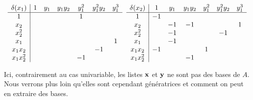 \documentclass{standalone}
\begin{document}
\begin{exmp}
$$\begin{array}{c|cccccc}
	\delta(x_1) & 1 & y_1 & y_1y_2 & y_1^2 & y_1^2y_2 & y_1^3 \\
	\hline
	1 &  &  &  & 1 &  & \\
	x_2 &  &  &  &  &  & \\
	x_2^2 &  &  &  &  &  & \\
	x_1 &  &  &  &  &  & 1\\
	x_1x_2 &  &  &  &  & -1 & \\
	x_1x_2^2 &  &  &  & -1 &  &
\end{array}
\hspace{0.2cm}
\begin{array}{c|cccccc}
	\delta(x_2) & 1 & y_1 & y_1y_2 & y_1^2 & y_1^2y_2 & y_1^3 \\
	\hline
	1 & -1 &  &  &  &  & \\
	x_2 &  & -1 & -1 &  &  & 1\\
	x_2^2 &  & -1 &  &  & -1 & \\
	x_1 &  & -1 &  &  &  & \\
	x_1x_2 & -1 &  &  & 1 &  & \\
	x_1x_2^2 &  &  & -1 &  &  &
\end{array}$$

\end{exmp}
\begin{rem}
Ici, contrairement au cas univariable, les listes $\bold{x}$ et $\bold{y}$ ne sont pas des bases de $A$. Nous verrons plus loin qu'elles sont cependant génératrices et comment on peut en extraire des bases.
\end{rem}
\end{document}
